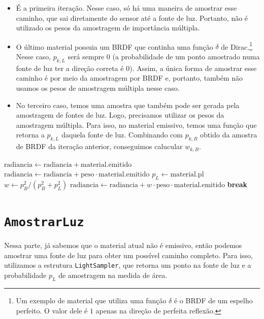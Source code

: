 \begin{itemize}
  \item É a primeira iteração. Nesse caso, só há uma maneira de amostrar esse
    caminho, que sai diretamente do sensor até a fonte de luz. Portanto, não é
    utilizado os pesos da amostragem de importância múltipla.
  \item O último material possuia um BRDF que continha uma função $\delta$ de
    Dirac.\footnote{Um exemplo de material que utiliza uma função $\delta$ é o
    BRDF de um espelho perfeito. O valor dele é $1$ apenas na direção de
    perfeita reflexão.} Nesse caso, $p_{k,L}$ será sempre 0 (a probabilidade de
    um ponto amostrado numa fonte de luz ter a direção correta é 0). Assim, a
    única forma de amostrar esse caminho é por meio da amostragem por BRDF e,
    portanto, também não usamos os pesos de amostragem múltipla nesse caso.
  \item No terceiro caso, temos uma amostra que também pode ser gerada pela
    amostragem de fontes de luz. Logo, precisamos utilizar os pesos da
    amostragem múltipla. Para isso, no material emissivo, temos uma função que
    retorna a $p_{k,L}$ daquela fonte de luz. Combinando com $p_{k,B}$ obtido
    da amostra de BRDF da iteração anterior, conseguimos calucular $w_{k,B}$.
\end{itemize}

\begin{algorithm}
\caption{Função AvaliaEmissao}
\begin{algorithmic}[1]
      \State $\text{radiancia} \gets \text{radiancia} + \text{material.emitido}$
      \State $\text{radiancia} \gets \text{radiancia} + \text{peso} \cdot \text{material.emitido}$
    \Else
      \State $p_L \gets \text{material.pl}$
      \State $w \gets p_B^2 / (p_B^2 + p_L^2)$
      \State $\text{radiancia} \gets \text{radiancia} + w \cdot \text{peso} \cdot \text{material.emitido}$
    \EndIf
    \State \textbf{break}
  \EndIf
  \EndFunction
\end{algorithmic}
\end{algorithm}


\section{\texttt{AmostrarLuz}}

Nessa parte, já sabemos que o material atual não é emissivo, então podemos
amostrar uma fonte de luz para obter um possível caminho completo. Para isso,
utilizamos a estrutura \texttt{LightSampler}, que retorna um ponto na fonte de
luz e a probabilidade $p_L$ de amostragem na medida de área.

